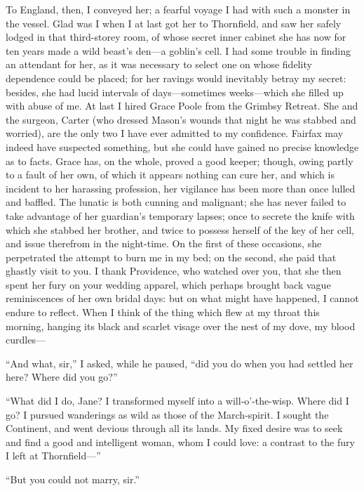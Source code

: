 {%
To England, then, I conveyed her; a fearful voyage I had with
such a monster in the vessel. Glad was I when I at last got her to
Thornfield, and saw her safely lodged in that third-storey room, of
whose secret inner cabinet she has now for ten years made a wild beast's
den---a goblin's cell. I had some trouble in finding an attendant for
her, as it was necessary to select one on whose fidelity dependence
could be placed; for her ravings would inevitably betray my secret:
besides, she had lucid intervals of days---sometimes weeks---which she
filled up with abuse of me. At last I hired Grace Poole from the
Grimbsy Retreat. She and the surgeon, Carter (who dressed Mason's
wounds that night he was stabbed and worried), are the only two I have
ever admitted to my confidence. \Mrs{} Fairfax may indeed have suspected
something, but she could have gained no precise knowledge as to facts. 
Grace has, on the whole, proved a good keeper; though, owing partly to a
fault of her own, of which it appears nothing can cure her, and which is
incident to her harassing profession, her vigilance has been more than
once lulled and baffled. The lunatic is both cunning and malignant; she
has never failed to take advantage of her guardian's temporary lapses;
once to secrete the knife with which she stabbed her brother, and twice
to possess herself of the key of her cell, and issue therefrom in the
night-time. On the first of these occasions, she perpetrated the
attempt to burn me in my bed; on the second, she paid that ghastly visit
to you. I thank Providence, who watched over you, that she then spent
her fury on your wedding apparel, which perhaps brought back vague
reminiscences of her own bridal days: but on what might have happened, I
cannot endure to reflect. When I think of the thing which flew at my
throat this morning, hanging its black and scarlet visage over the nest
of my dove, my blood curdles---}

\enquote{And what, sir,} I asked, while he paused, \enquote{did you do
when you had settled her here? Where did you go?}

\enquote{What did I do, Jane? I transformed myself into a
will-o'-the-wisp. Where did I go? I pursued wanderings as wild as
those of the March-spirit. I sought the Continent, and went devious
through all its lands. My fixed desire was to seek and find a good and
intelligent woman, whom I could love: a contrast to the fury I left at
Thornfield---}

\enquote{But you could not marry, sir.}

